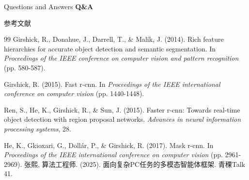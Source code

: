 \documentclass{beamer}
\begin{document}
\begin{frame}{Questions and Answers}
  \centering
  \vspace{0.8cm}
  {\Huge \bfseries Q\&A}
\end{frame}

\begin{frame}[allowframebreaks]{参考文献}
     

    \begin{thebibliography}{99}
        Girshick, R., Donahue, J., Darrell, T., \& Malik, J. (2014). Rich feature hierarchies for accurate object detection and semantic segmentation. In \textit{Proceedings of the IEEE conference on computer vision and pattern recognition} (pp. 580-587).
        
        Girshick, R. (2015). Fast r-cnn. In \textit{Proceedings of the IEEE international conference on computer vision} (pp. 1440-1448).
        
        Ren, S., He, K., Girshick, R., \& Sun, J. (2015). Faster r-cnn: Towards real-time object detection with region proposal networks. \textit{Advances in neural information processing systems}, 28.
        
        He, K., Gkioxari, G., Dollár, P., \& Girshick, R. (2017). Mask r-cnn. In \textit{Proceedings of the IEEE international conference on computer vision} (pp. 2961-2969).
        张熙, 算法工程师. (2025). 面向复杂PC任务的多模态智能体框架. 青稞Talk 41.


    \end{thebibliography}
\end{frame}

\begin{frame}[plain]
\end{frame}
\end{document}
